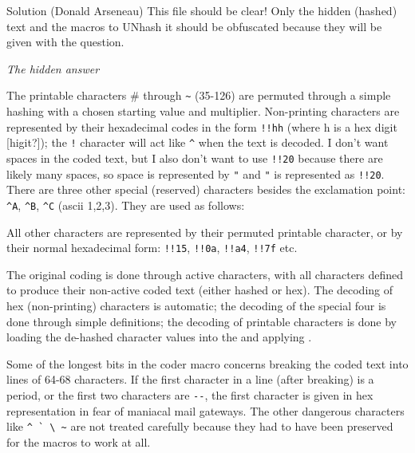 \begin{solution}{Solution (Donald Arseneau)}
 This file should be clear!  Only the hidden (hashed) text and
 the macros to UNhash it should be obfuscated because they will
 be given with the question.

\noindent\textit{The hidden answer}


 The printable characters \# through \verb?~? (35-126) are permuted
 through a simple hashing with a chosen starting value and
 multiplier. Non-printing characters are represented by their
 hexadecimal codes in the form \verb?!!hh? (where h is a hex digit
 [higit?]); the \verb?!? character will act like \verb?^? when the text is
 decoded.  I don't want spaces in the coded text, but I also
 don't want to use \verb?!!20? because there are likely many spaces, so
 space is represented by \verb?"? and \verb?"? is represented as \verb?!!20?.
 There are three other special (reserved) characters besides the
 exclamation point: \verb?^A?, \verb?^B?, \verb?^C? (ascii 1,2,3).  
 They are used as  follows:
\begin{lcode}
\end{lcode}

 All other characters are represented by their permuted
 printable character, or by their normal hexadecimal form:
 \verb?!!15?, \verb?!!0a?, \verb?!!a4?, \verb?!!7f? etc.

 The original coding is done through active characters, with
 all characters defined to produce their non-active coded text
 (either hashed or hex).  The decoding of hex (non-printing)
 characters is automatic; the decoding of the special four is
 done through simple definitions; the decoding of printable
 characters is done by loading the de-hashed character values
 into the \cmd{\lccode} and applying \cmd{\lowercase}.

 Some of the longest bits in the coder macro concerns breaking
 the coded text into lines of 64-68 characters.  If the first
 character in a line (after breaking) is a period, or the first
 two characters are \verb?--?, the first character is given in hex
 representation in fear of maniacal mail gateways.  The other
 dangerous characters like \verb?^ ` \ ~? are not treated carefully
 because they had to have been preserved for the macros to work
 at all.


\end{solution}
